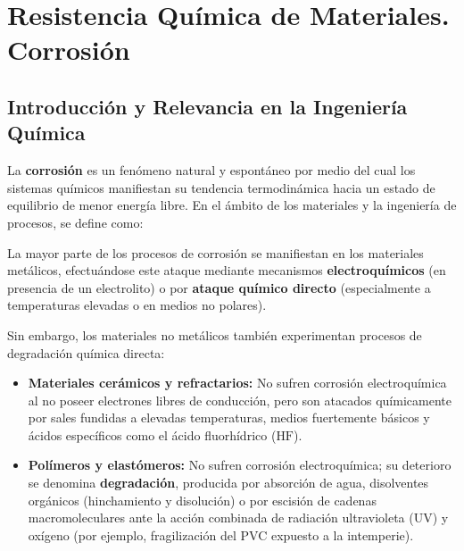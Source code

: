 \chapter{Resistencia Química de Materiales. Corrosión}

\section{Introducción y Relevancia en la Ingeniería Química}

La \textbf{corrosión} es un fenómeno natural y espontáneo por medio del cual los sistemas químicos manifiestan su tendencia termodinámica hacia un estado de equilibrio de menor energía libre. En el ámbito de los materiales y la ingeniería de procesos, se define como:


La mayor parte de los procesos de corrosión se manifiestan en los materiales metálicos, efectuándose este ataque mediante mecanismos \textbf{electroquímicos} (en presencia de un electrolito) o por \textbf{ataque químico directo} (especialmente a temperaturas elevadas o en medios no polares). 

Sin embargo, los materiales no metálicos también experimentan procesos de degradación química directa:
\begin{itemize}
    \item \textbf{Materiales cerámicos y refractarios:} No sufren corrosión electroquímica al no poseer electrones libres de conducción, pero son atacados químicamente por sales fundidas a elevadas temperaturas, medios fuertemente básicos y ácidos específicos como el ácido fluorhídrico ($\text{HF}$).
    \item \textbf{Polímeros y elastómeros:} No sufren corrosión electroquímica; su deterioro se denomina \textbf{degradación}, producida por absorción de agua, disolventes orgánicos (hinchamiento y disolución) o por escisión de cadenas macromoleculares ante la acción combinada de radiación ultravioleta (UV) y oxígeno (por ejemplo, fragilización del PVC expuesto a la intemperie).
\end{itemize}


